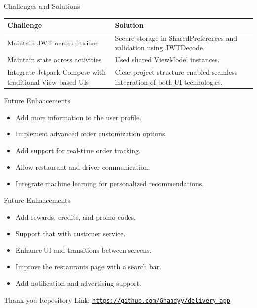 \documentclass{beamer}
\begin{document}
\begin{frame}{Challenges and Solutions}
    \begin{tabular}{| p{5cm} | p{5cm} |}
        \hline
        \textbf{Challenge}                                        & \textbf{Solution}                                                             \\
        \hline
        Maintain JWT across sessions                              & Secure storage in SharedPreferences and validation using JWTDecode.           \\
        \hline
        Maintain state across activities                          & Used shared ViewModel instances.                                              \\
        \hline
        Integrate Jetpack Compose with traditional View-based UIs & Clear project structure enabled seamless integration of both UI technologies. \\
        \hline
    \end{tabular}
\end{frame}

\begin{frame}{Future Enhancements}
    \begin{itemize}
        \item Add more information to the user profile.
              \vspace{0.3cm}
        \item Implement advanced order customization options.
              \vspace{0.3cm}
        \item Add support for real-time order tracking.
              \vspace{0.3cm}
        \item Allow restaurant and driver communication.
              \vspace{0.3cm}
        \item Integrate machine learning for personalized recommendations.
    \end{itemize}
\end{frame}

\begin{frame}{Future Enhancements}
    \begin{itemize}
        \item Add rewards, credits, and promo codes.
              \vspace{0.3cm}
        \item Support chat with customer service.
              \vspace{0.3cm}
        \item Enhance UI and transitions between screens.
              \vspace{0.3cm}
        \item Improve the restaurants page with a search bar.
              \vspace{0.3cm}
        \item Add notification and advertising support.
    \end{itemize}
\end{frame}

\begin{frame}{Thank you}
    Repository Link: \texttt{\href{https://github.com/Ghaadyy/delivery-app}{https://github.com/Ghaadyy/delivery-app}}
\end{frame}
\end{document}
